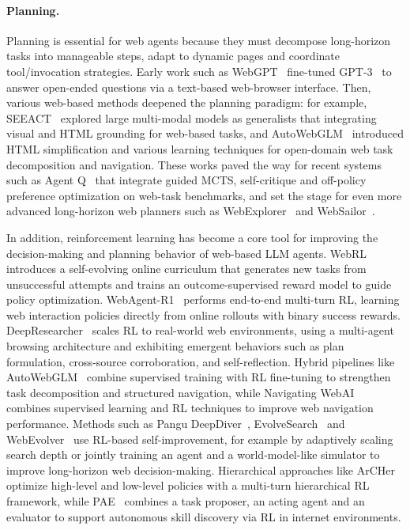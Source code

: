 \paragraph{Planning.}



Planning is essential for web agents because they must decompose long-horizon tasks into manageable steps, adapt to dynamic pages and coordinate tool/invocation strategies. Early work such as WebGPT~\cite{nakano2021webgpt} fine-tuned GPT-3~\cite{brown2020language} to answer open-ended questions via a text-based web-browser interface. Then, various web-based methods deepened the planning paradigm: for example, SEEACT~\cite{zheng2024gpt} explored large multi-modal models as generalists that integrating visual and HTML grounding for web-based tasks, and AutoWebGLM~\cite{lai2024autowebglm} introduced HTML simplification and various learning techniques for open-domain web task decomposition and navigation. These works paved the way for recent systems such as Agent Q~\cite{putta2024agent} that integrate guided MCTS, self-critique and off-policy preference optimization on web-task benchmarks, and set the stage for even more advanced long-horizon web planners such as WebExplorer~\cite{liu2025webexplorer} and WebSailor~\cite{li2025websailor}.




In addition, reinforcement learning has become a core tool for improving the decision-making and planning behavior of web-based LLM agents. WebRL~\cite{qi2024webrl} introduces a self-evolving online curriculum that generates new tasks from unsuccessful attempts and trains an outcome-supervised reward model to guide policy optimization. WebAgent-R1~\cite{wei2025webagent} performs end-to-end multi-turn RL, learning web interaction policies directly from online rollouts with binary success rewards. DeepResearcher~\cite{zheng2025deepresearcher} scales RL to real-world web environments, using a multi-agent browsing architecture and exhibiting emergent behaviors such as plan formulation, cross-source corroboration, and self-reflection. Hybrid pipelines like AutoWebGLM~\cite{lai2024autowebglm} combine supervised training with RL fine-tuning to strengthen task decomposition and structured navigation, while Navigating WebAI~\cite{thil2024navigating} combines supervised learning and RL techniques to improve web navigation performance. Methods such as Pangu DeepDiver~\cite{shi2025pangu}, EvolveSearch~\cite{zhang2025evolvesearch}  and WebEvolver~\cite{fang2025webevolver} use RL-based self-improvement, for example by adaptively scaling search depth or jointly training an agent and a world-model-like simulator to improve long-horizon web decision-making. Hierarchical approaches like ArCHer~\cite{zhou2024archer} optimize high-level and low-level policies with a multi-turn hierarchical RL framework, while PAE~\cite{zhou2025proposer} combines a task proposer, an acting agent and an evaluator to support autonomous skill discovery via RL in internet environments. 


